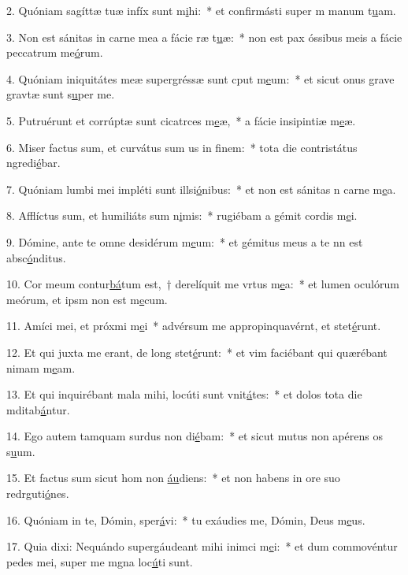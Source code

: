 2. Quóniam sagíttæ tuæ infíx sunt m\uline{i}hi:~* et confirmásti super m manum t\uline{u}am.\par 
3. Non est sánitas in carne mea a fácie ræ t\uline{u}æ:~* non est pax óssibus meis a fácie peccatrum me\uline{ó}rum.\par 
4. Quóniam iniquitátes meæ supergréssæ sunt cput m\uline{e}um:~* et sicut onus grave gravtæ sunt s\uline{u}per me.\par 
5. Putruérunt et corrúptæ sunt cicatrces m\uline{e}æ,~* a fácie insipintiæ m\uline{e}æ.\par 
6. Miser factus sum, et curvátus sum us in f\uline{i}nem:~* tota die contristátus ngredi\uline{é}bar.\par 
7. Quóniam lumbi mei impléti sunt illsi\uline{ó}nibus:~* et non est sánitas n carne m\uline{e}a.\par 
8. Afflíctus sum, et humiliáts sum n\uline{i}mis:~* rugiébam a gémit cordis m\uline{e}i.\par 
9. Dómine, ante te omne desidérum m\uline{e}um:~* et gémitus meus a te nn est absc\uline{ó}nditus.\par 
10. Cor meum contur\uline{bá}tum est,~† derelíquit me vrtus m\uline{e}a:~* et lumen oculórum meórum, et ipsm non est m\uline{e}cum.\par 
11. Amíci mei, et próxmi m\uline{e}i~* advérsum me appropinquavérnt, et stet\uline{é}runt.\par 
12. Et qui juxta me erant, de long stet\uline{é}runt:~* et vim faciébant qui quærébant nimam m\uline{e}am.\par 
13. Et qui inquirébant mala mihi, locúti sunt vnit\uline{á}tes:~* et dolos tota die mditab\uline{á}ntur.\par 
14. Ego autem tamquam surdus non di\uline{é}bam:~* et sicut mutus non apérens os s\uline{u}um.\par 
15. Et factus sum sicut hom non \uline{áu}diens:~* et non habens in ore suo redrguti\uline{ó}nes.\par 
16. Quóniam in te, Dómin, sper\uline{á}vi:~* tu exáudies me, Dómin, Deus m\uline{e}us.\par 
17. Quia dixi: Nequándo supergáudeant mihi inimci m\uline{e}i:~* et dum commovéntur pedes mei, super me mgna loc\uline{ú}ti sunt.\par 
